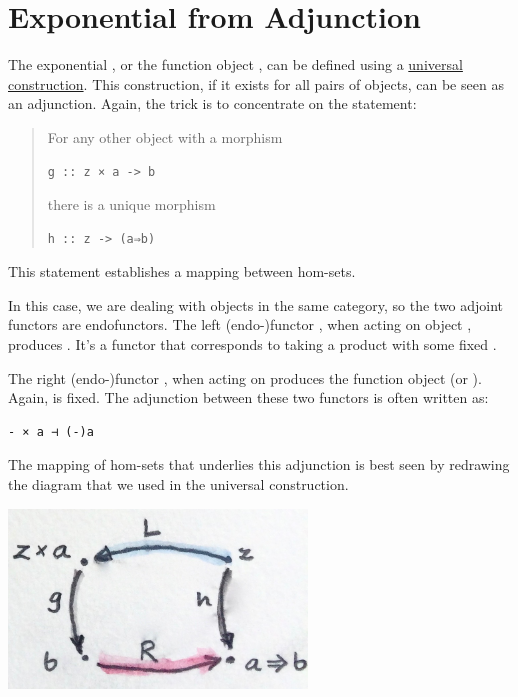 \section{Exponential from
Adjunction}\label{exponential-from-adjunction}

The exponential , or the function object , can be
defined using a
\href{https://bartoszmilewski.com/2015/03/13/function-types/}{universal
construction}. This construction, if it exists for all pairs of objects,
can be seen as an adjunction. Again, the trick is to concentrate on the
statement:

\begin{quote}
For any other object  with a morphism

\begin{verbatim}
g :: z × a -> b
\end{verbatim}

there is a unique morphism

\begin{verbatim}
h :: z -> (a⇒b)
\end{verbatim}
\end{quote}

This statement establishes a mapping between hom-sets.

In this case, we are dealing with objects in the same category, so the
two adjoint functors are endofunctors. The left (endo-)functor
, when acting on object , produces .
It's a functor that corresponds to taking a product with some fixed
.

The right (endo-)functor , when acting on  produces
the function object  (or ). Again,  is
fixed. The adjunction between these two functors is often written as:

\begin{verbatim}
- × a ⊣ (-)a
\end{verbatim}

The mapping of hom-sets that underlies this adjunction is best seen by
redrawing the diagram that we used in the universal construction.

\includegraphics[width=3.12500in]{images/adj-expo.jpg}

